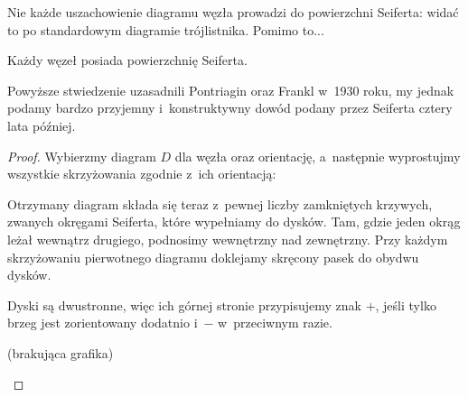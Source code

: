 Nie każde uszachowienie diagramu węzła prowadzi do powierzchni Seiferta:
widać to po standardowym diagramie trójlistnika.
Pomimo to...

\begin{proposition}
    \label{seifert_existence}
    Każdy węzeł posiada powierzchnię Seiferta.
\end{proposition}

Powyższe stwiedzenie uzasadnili Pontriagin oraz Frankl w~1930 roku, my jednak podamy bardzo przyjemny i~konstruktywny dowód podany przez Seiferta \cite{seifert35} cztery lata później.

\begin{proof}
    Wybierzmy diagram $D$ dla węzła oraz orientację,
    a~następnie wyprostujmy wszystkie skrzyżowania zgodnie z~ich orientacją:
\begin{comment}
    \[
    \begin{tikzpicture}[scale=0.12, baseline=-3]
        \begin{knot}[clip width=15, end tolerance=1pt,flip crossing/.list={1}]
            \strand[semithick,Latex-] (-5,5) to (5,-5);
            \strand[semithick,-Latex] (-5,-5) to (5,5);
        \end{knot}
    \end{tikzpicture}
    \quad\longrightarrow\quad
        \begin{tikzpicture}[baseline=-0.65ex, scale=0.12]
        \useasboundingbox (-5, -6) rectangle (5, 6);
        \draw[semithick,-Latex] (-4, -5) to [out=45, in=-45] (-4, 5);
        \draw[semithick,-Latex] (4, -5) to [out=135, in=-135] (4, 5);
        \end{tikzpicture}
        \quad\longleftarrow\quad
    \begin{tikzpicture}[scale=0.12, baseline=-3]
        \begin{knot}[clip width=15, end tolerance=1pt]
            \strand[semithick,Latex-] (-5,5) to (5,-5);
            \strand[semithick,-Latex] (-5,-5) to (5,5);
        \end{knot}
    \end{tikzpicture}
    \]
\end{comment}

    Otrzymany diagram składa się teraz z~pewnej liczby zamkniętych krzywych,
    zwanych okręgami Seiferta, które wypełniamy do dysków.
    Tam, gdzie jeden okrąg leżał wewnątrz drugiego, podnosimy wewnętrzny nad zewnętrzny.
    Przy każdym skrzyżowaniu pierwotnego diagramu doklejamy skręcony pasek do obydwu dysków.

    Dyski są dwustronne, więc ich górnej stronie przypisujemy znak $+$,
    jeśli tylko brzeg jest zorientowany dodatnio i~$-$ w~przeciwnym razie.

    \begin{center}
        (brakująca grafika)
    \end{center}
\end{proof}

